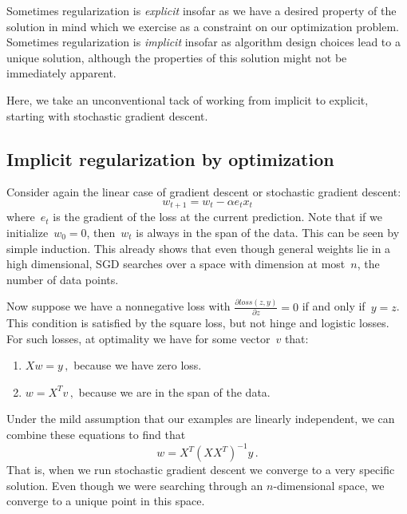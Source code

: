 \documentclass{tufte-book}
\begin{document}
Sometimes regularization is \emph{explicit} insofar as we have a desired
property of the solution in mind which we exercise as a constraint on
our optimization problem. Sometimes regularization is \emph{implicit}
insofar as algorithm design choices lead to a unique solution, although
the properties of this solution might not be immediately
apparent.

Here, we take an unconventional tack of working from implicit to
explicit, starting with stochastic gradient descent.

\hypertarget{implicit-regularization-by-optimization}{%
\subsection{Implicit regularization by
optimization}\label{implicit-regularization-by-optimization}}


Consider again the linear case of gradient descent or stochastic
gradient descent: \[
    w_{t+1} = w_t - \alpha e_t x_t
\] where~\(e_t\) is the gradient of the loss at the current prediction.
Note that if we initialize~\(w_0=0\), then~\(w_t\) is always in the span
of the data. This can be seen by simple induction. This already shows
that even though general weights lie in a high dimensional, SGD searches
over a space with dimension at most~\(n\), the number of data points.

Now suppose we have a nonnegative loss with
\(\frac{\partial \mathit{loss}(z,y)}{\partial z} = 0\) if and only
if~\(y=z\). This condition is satisfied by the square loss, but not
hinge and logistic losses. For such losses, at optimality we have for
some vector~\(v\) that:

\begin{enumerate}
\def\labelenumi{\arabic{enumi}.}
\tightlist
\item
  \(Xw = y\,,\) because we have zero loss.
\item
  \(w = X^T v\,,\) because we are in the span of the data.
\end{enumerate}

Under the mild assumption that our examples are linearly independent, we
can combine these equations to find that \[
    w=X^T(XX^T)^{-1}y\,.
\] That is, when we run stochastic gradient descent we converge to a
very specific solution. Even though we were searching through an
\(n\)-dimensional space, we converge to a unique point in this space.
\end{document}
